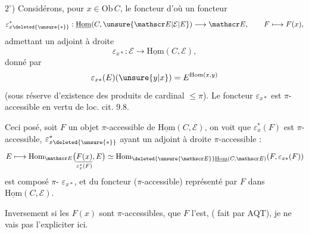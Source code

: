 $2^\circ$) Considérons, pour $x\in\mathrm{Ob}\,C$, le foncteur
d'où un foncteur
\[
\varepsilon_{x\deleted{\unsure{*}}}^*:\underline{\mathrm{Hom}}(C,\unsure{\mathscr E|\mathcal E|E})\longrightarrow\mathscr E,\qquad F\longmapsto F(x),
\]
admettant un adjoint à droite
\[
\varepsilon_{x*}:\mathscr E\longrightarrow\underline{\mathrm{Hom}}(C,\mathscr E),
\]
donné par
\[
\varepsilon_{x*}(E)(\unsure{y|x})=E^{\mathrm{Hom}(x,y)}
\]
(sous réserve d'existence des produits de cardinal $\leq\pi$). Le foncteur $\varepsilon_{x*}$ est $\pi$-accessible en vertu de loc. cit. 9.8.

Ceci posé, soit $F$ un objet $\pi$-accessible de $\underline{\mathrm{Hom}}(C,\mathscr E)$, on voit que $\varepsilon_x^*(F)$ est $\pi$-accessible, $\varepsilon_{x\deleted{\unsure{*}}}^*$  ayant un adjoint à droite $\pi$-accessible :
\[
E\longmapsto\mathrm{Hom}_{\mathscr E}\bigl(\underset{\varepsilon_x^*(F)}{\underline{F(x)}},E\bigr)
\simeq\mathrm{Hom}_{\deleted{\unsure{\mathscr E}}\underline{\mathrm{Hom}}(C,\mathscr E)}(F,\varepsilon_{x*}(F))
\]
est composé  $\pi$- $\varepsilon_{x*}$, et du foncteur  ($\pi$-accessible) représenté par $F$ dans $\underline{\mathrm{Hom}}(C,\mathscr E)$.

Inversement si les $F(x)$ sont $\pi$-accessibles,  que $F$ l'est,  ( fait par AQT), je ne vais pas l'expliciter ici.

